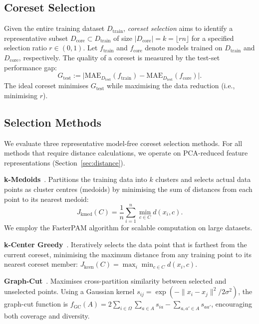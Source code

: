 \documentclass[journal]{IEEEtran}
\newcommand{\MAE}{\mathrm{MAE}}
\newcommand{\Dtrain}{D_{\mathrm{train}}}
\newcommand{\Dtest}{D_{\mathrm{test}}}
\newcommand{\Dcore}{D_{\mathrm{core}}}
\newcommand{\ftrain}{f_{\mathrm{train}}}
\newcommand{\fcore}{f_{\mathrm{core}}}
\newcommand{\Gtest}{G_{\mathrm{test}}}
\newcommand{\Jkmed}{J_{\mathrm{kmed}}}
\begin{document}
\subsection{Coreset Selection}

Given the entire training dataset $\Dtrain$, \emph{coreset
selection} aims to identify a representative subset
$\Dcore \subset \Dtrain$ of size $|\Dcore| = k = \lfloor rn \rfloor$
for a specified selection ratio $r \in (0, 1)$.
Let $\ftrain$ and $\fcore$ denote models trained on $\Dtrain$ and
$\Dcore$, respectively.
The quality of a coreset is measured by the test-set performance gap:
\begin{equation}\label{eq:gtest}
  \Gtest := \bigl|
    \MAE_{\Dtest}(\ftrain) - \MAE_{\Dtest}(\fcore)
  \bigr|.
\end{equation}
The ideal coreset minimises $\Gtest$ while maximising the data
reduction (i.e., minimising $r$).


\subsection{Selection Methods}
\label{sec:methods}

We evaluate three representative model-free coreset selection
methods.
For all methods that require distance calculations, we operate on
PCA-reduced feature representations (Section~\ref{sec:distance}).

\textbf{k-Medoids}~\cite{kaufmann_clustering_1987}.
Partitions the training data into $k$ clusters and selects actual
data points as cluster centres (medoids) by minimising the sum of
distances from each point to its nearest medoid:
\begin{equation}
  \Jkmed(C) = \frac{1}{n}\sum_{i=1}^{n}\min_{c \in C} d(x_i, c).
\end{equation}
We employ the FasterPAM algorithm for scalable computation on
large datasets.

\textbf{k-Center Greedy}~\cite{sener_active_2018}.
Iteratively selects the data point that is farthest from the
current coreset, minimising the maximum distance from any
training point to its nearest coreset member:
$J_{\mathrm{kcen}}(C) = \max_{i}\min_{c \in C} d(x_i, c)$.

\textbf{Graph-Cut}~\cite{iyer_submodular_2021}.
Maximises cross-partition similarity between selected and
unselected points.
Using a Gaussian kernel
$s_{ij} = \exp(-\|x_i - x_j\|^2 / 2\sigma^2)$, the graph-cut
function is
$f_{\mathrm{GC}}(A) = 2\sum_{i \in \Omega} \sum_{a \in A} s_{ia}
- \sum_{a, a' \in A} s_{aa'}$,
encouraging both coverage and diversity.
\end{document}
